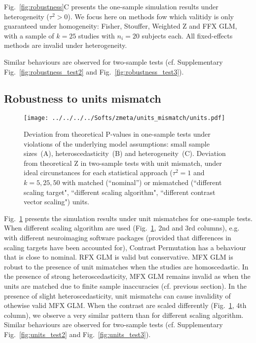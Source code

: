 \documentclass[preprint]{elsarticle}
\newcommand{\nStudies}{k}
\newcommand{\varBetween}{\tau^2}
\newcommand{\nSubjects}[1][i]{n_{#1}}
\begin{document}
Fig.~\ref{fig:robustness}C presents the one-sample simulation results under heterogeneity ($\varBetween>0$). We focus here on methods fow which valitidy is only guaranteed under homogeneity: Fisher, Stouffer, Weighted Z and FFX GLM, with a sample of $\nStudies=25$ studies with $\nSubjects=20$ subjects each. All fixed-effects methods are invalid under heterogeneity.

Similar behaviours are observed for two-sample tests (cf. Supplementary Fig.~\ref{fig:robustness_test2} and Fig.~\ref{fig:robustness_test3}).

\subsection{Robustness to units mismatch}

\begin{figure}[h]
	\centering
 	\texttt{[image: ../../../../Softs/zmeta/units\_mismatch/units.pdf]}
	\caption{Deviation from theoretical P-values in one-sample tests under violations of the underlying model assumptions: small sample sizes~(A), heteroscedasticity~(B) and heterogeneity~(C). Deviation from theoretical Z in two-sample tests with unit mismatch, under ideal circunstances for each statistical approach ($\varBetween=1$ and $\nStudies = 5, 25, 50$ with matched (``nominal'') or mismatched (``different scaling target", ``different scaling algorithm", ``different contrast vector scaling") units.}
	\label{fig:units}
\end{figure}

Fig.~\ref{fig:units} presents the simulation results under unit mismatches for one-sample tests. When different scaling algorithm are used (Fig.~\ref{fig:units}, 2nd and 3rd columns), e.g. with different neuroimaging software packages (provided that differences in scaling targets have been accounted for), Contrast Permutation has a behaviour that is close to nominal. RFX GLM is valid but conservative. MFX GLM is robust to the presence of unit mimatches when the studies are homoscedastic. In the presence of strong heteroscedasticity, MFX GLM remains invalid as when the units are matched due to finite sample inaccuracies (cf. previous section). In the presence of slight heteroscedasticity, unit mismatchs can cause invalidity of othewise valid MFX GLM. When the contrast are scaled differently (Fig.~\ref{fig:units}, 4th column), we observe a very similar pattern than for different scaling algorithm. Similar behaviours are observed for two-sample tests (cf. Supplementary Fig.~\ref{fig:units_test2} and Fig.~\ref{fig:units_test3}).
\end{document}
